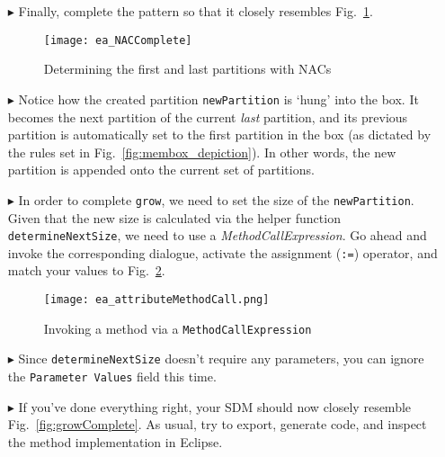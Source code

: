 \begin{itemize}
\item[$\blacktriangleright$] Finally, complete the pattern so that it closely resembles Fig.~\ref{fig:sdm_grow_3}. 

\begin{figure}[htbp]
\begin{center}
  \texttt{[image: ea\_NACComplete]} 
  \caption{Determining the first and last partitions with NACs}  
  \label{fig:sdm_grow_3}
\end{center}
\end{figure}
 
\item[$\blacktriangleright$] Notice how the created partition \texttt{newPartition} is `hung' into the box. It becomes the next partition of the current
\emph{last} partition, and its previous partition is automatically set to the first partition in the box (as dictated by the rules set in
Fig.~\ref{fig:membox_depiction}). In other words, the new partition is appended onto the current set of partitions.

\item[$\blacktriangleright$] In order to complete \texttt{grow}, we need to set the size of the \texttt{newPartition}. Given that the new size is calculated
via the helper function \texttt{det\-er\-mine\-Next\-Size}, we need to use a \emph{MethodCallExpression}. Go ahead and invoke the corresponding dialogue,
activate the assignment (\texttt{:=}) operator, and match your values to Fig.~\ref{fig:sdm_grow_4}.
 
\begin{figure}[htbp]
\begin{center}
  \texttt{[image: ea\_attributeMethodCall.png]}
  \caption{Invoking a method via a \texttt{MethodCallExpression}}  
  \label{fig:sdm_grow_4} 
\end{center}
\end{figure}

\item[$\blacktriangleright$] Since \texttt{determineNextSize} doesn't require any parameters, you can ignore the \texttt{Parameter Values} field this time. 

\vspace{0.5cm}

\item[$\blacktriangleright$] If you've done everything right, your SDM should now closely resemble Fig.~\ref{fig:growComplete}. As usual, try to export,
generate code, and inspect the method implementation in Eclipse.


\end{itemize}
